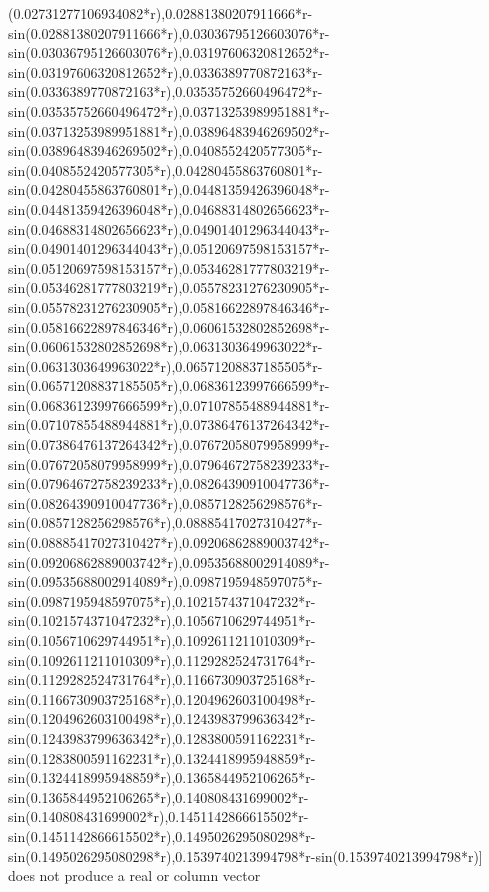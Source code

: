 \documentclass[12pt,Times new roman,letterpaper]{book}
\begin{document}
\begin{eulernootebook}
\begin{eulercomment}
\begin{eulercomment}
\begin{eulernootebook}
\begin{eulercomment}
\begin{eulercomment}
\begin{eulercomment}
\begin{eulercomment}
\begin{eulercomment}
\begin{eulercomment}
\begin{eulernotebook}
\begin{eulercomment}
\begin{eulercomment}
\begin{eulercomment}
\begin{eulercomment}
\begin{eulercomment}
\begin{eulercomment}
\begin{eulercomment}
\begin{eulercomment}
\begin{eulercomment}
\begin{eulercomment}
\begin{eulercomment}
\begin{eulercomment}
\begin{eulercomment}
\begin{eulercomment}
\begin{eulercomment}
\begin{eulercomment}
\begin{euleroutput}
(0.02731277106934082*r),0.02881380207911666*r-sin(0.02881380207911666*r),0.03036795126603076*r-sin(0.03036795126603076*r),0.03197606320812652*r-sin(0.03197606320812652*r),0.0336389770872163*r-sin(0.0336389770872163*r),0.03535752660496472*r-sin(0.03535752660496472*r),0.03713253989951881*r-sin(0.03713253989951881*r),0.03896483946269502*r-sin(0.03896483946269502*r),0.0408552420577305*r-sin(0.0408552420577305*r),0.04280455863760801*r-sin(0.04280455863760801*r),0.04481359426396048*r-sin(0.04481359426396048*r),0.04688314802656623*r-sin(0.04688314802656623*r),0.04901401296344043*r-sin(0.04901401296344043*r),0.05120697598153157*r-sin(0.05120697598153157*r),0.05346281777803219*r-sin(0.05346281777803219*r),0.05578231276230905*r-sin(0.05578231276230905*r),0.05816622897846346*r-sin(0.05816622897846346*r),0.06061532802852698*r-sin(0.06061532802852698*r),0.0631303649963022*r-sin(0.0631303649963022*r),0.06571208837185505*r-sin(0.06571208837185505*r),0.06836123997666599*r-sin(0.06836123997666599*r),0.07107855488944881*r-sin(0.07107855488944881*r),0.07386476137264342*r-sin(0.07386476137264342*r),0.07672058079958999*r-sin(0.07672058079958999*r),0.07964672758239233*r-sin(0.07964672758239233*r),0.08264390910047736*r-sin(0.08264390910047736*r),0.0857128256298576*r-sin(0.0857128256298576*r),0.08885417027310427*r-sin(0.08885417027310427*r),0.09206862889003742*r-sin(0.09206862889003742*r),0.09535688002914089*r-sin(0.09535688002914089*r),0.0987195948597075*r-sin(0.0987195948597075*r),0.1021574371047232*r-sin(0.1021574371047232*r),0.1056710629744951*r-sin(0.1056710629744951*r),0.1092611211010309*r-sin(0.1092611211010309*r),0.1129282524731764*r-sin(0.1129282524731764*r),0.1166730903725168*r-sin(0.1166730903725168*r),0.1204962603100498*r-sin(0.1204962603100498*r),0.1243983799636342*r-sin(0.1243983799636342*r),0.1283800591162231*r-sin(0.1283800591162231*r),0.1324418995948859*r-sin(0.1324418995948859*r),0.1365844952106265*r-sin(0.1365844952106265*r),0.140808431699002*r-sin(0.140808431699002*r),0.1451142866615502*r-sin(0.1451142866615502*r),0.1495026295080298*r-sin(0.1495026295080298*r),0.1539740213994798*r-sin(0.1539740213994798*r)] does not produce a real or column vector
  

\end{euleroutput}
\end{eulercomment}
\end{eulercomment}
\end{eulercomment}
\end{eulercomment}
\end{eulercomment}
\end{eulercomment}
\end{eulercomment}
\end{eulercomment}
\end{eulercomment}
\end{eulercomment}
\end{eulercomment}
\end{eulercomment}
\end{eulercomment}
\end{eulercomment}
\end{eulercomment}
\end{eulercomment}
\end{eulernotebook}
\end{eulercomment}
\end{eulercomment}
\end{eulercomment}
\end{eulercomment}
\end{eulercomment}
\end{eulercomment}
\end{eulernootebook}
\end{eulercomment}
\end{eulercomment}
\end{eulernootebook}
\end{document}
